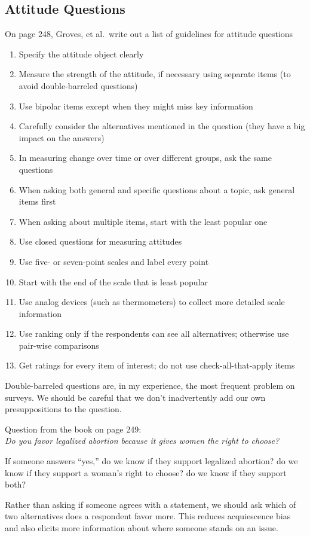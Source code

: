 \documentclass[11pt]{lecturenotes}
\begin{document}
\subsection[20]{Attitude Questions}
On page 248, Groves, et al.\ write out a list of guidelines for attitude questions
\begin{enumerate}[noitemsep]
\item Specify the attitude object clearly
\item Measure the strength of the attitude, if necessary using separate items (to avoid double-barreled questions)
\item Use bipolar items except when they might miss key information
\item Carefully consider the alternatives mentioned in the question (they have a big impact on the answers)
\item In measuring change over time or over different groups, ask the same questions
\item When asking both general and specific questions about a topic, ask general items first
\item When asking about multiple items, start with the least popular one
\item Use closed questions for measuring attitudes
\item Use five- or seven-point scales and label every point
\item Start with the end of the scale that is least popular
\item Use analog devices (such as thermometers) to collect more detailed scale information
\item Use ranking only if the respondents can see all alternatives; otherwise use pair-wise comparisons
\item Get ratings for every item of interest; do not use check-all-that-apply items
\end{enumerate}

\slide
{}

Double-barreled questions are, in my experience, the most frequent problem on surveys. We should be careful that we don't inadvertently add our own presuppositions to the question. 

Question from the book on page 249:\\
\textit{Do you favor legalized abortion because it gives women the right to choose?}

If someone answers ``yes,'' do we know if they support legalized abortion? do we know if they support a woman's right to choose? do we know if they support both? 

\slide 
{}

Rather than asking if someone agrees with a statement, we should ask which of two alternatives does a respondent favor more. This reduces acquiescence bias and also elicits more information about where someone stands on an issue.
\end{document}
